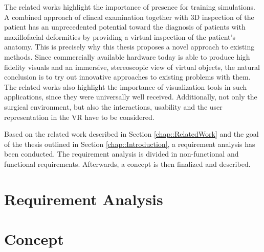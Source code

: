 The related works highlight the importance of presence for training simulations.
A combined approach of clincal examination together with 3D inspection of the patient has an unprecedented potential toward the diagnosis of patients with maxillofacial deformities \cite{swennen2009three} by providing a virtual inspection of the patient’s anatomy.
This is precisely why this thesis proposes a novel approach to existing methods.
Since commercially available hardware today is able to produce high fidelity visuals and an immersive, stereoscopic view of virtual objects,
the natural conclusion is to try out innovative approaches to existing problems with them.
The related works also highlight the importance of visualization tools in such applications, since they were universally well received. 
Additionally, not only the surgical environment, but also the interactions, usability and the user representation in the VR have to be considered.

Based on the related work described in Section \ref{chap::RelatedWork} and the goal of the thesis outlined in Section \ref{chap::Introduction}, a requirement analysis has been conducted.
The requirement analysis is divided in non-functional and functional requirements.
Afterwards, a concept is then finalized and described.

\section{\label{sec::RequirementAnalysis}Requirement Analysis}

\section{\label{sec::Concept}Concept}
